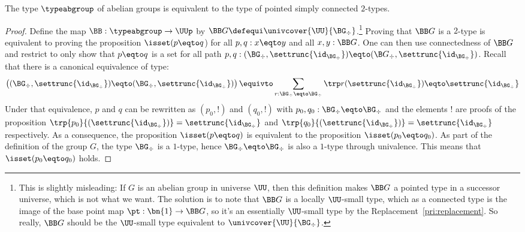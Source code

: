 \begin{theorem}\label{thm:abelian-groups-weq-sc2types}%
  The type $\typeabgroup$ of abelian groups is equivalent to the type
  of pointed simply connected $2$-types.
\end{theorem}
\begin{proof}
  Define the map $\BB : \typeabgroup \to \UUp$ by
  $\BB G\defequi \univcover{\UU}{\BG_\div}$.\footnote{%
    This is slightly misleading: If $G$ is an abelian group in
    universe $\UU$, then this definition makes $\BB G$ a pointed type
    in a successor universe, which is not what we want.  The solution
    is to note that $\BB G$ is a locally $\UU$-small type, which as a
    connected type is the image of the base point map
    $\pt : \bn{1} \to \BB G$, so it's an essentially $\UU$-small type
    by the Replacement~\cref{pri:replacement}.  So really, $\BB G$
    should be the $\UU$-small type equivalent to
    $\univcover{\UU}{\BG_\div}$.}  Proving that $\BB G$ is a $2$-type
  is equivalent to proving the proposition $\isset(p\eqto q$) for all
  $p,q:x\eqto y$ and all $x,y:\BB G$. One can then use connectedness
  of $\BB G$ and restrict to only show that $p\eqto q$ is a set for
  all path
  $p,q:(\BG_\div,\settrunc{\id_{\BG_\div}})\eqto ({\B
    G}_\div,\settrunc{\id_{\BG_\div}})$. Recall that there is a
  canonical equivalence of type:
  \begin{equation}\label{eq:}
    \left(
      (\BG_\div,\settrunc{\id_{\BG_\div}})\eqto (\BG_\div,\settrunc{\id_{\BG_\div}})
    \right)
    \equivto
    \sum_{r:\BG_\div \eqto \BG_\div}\trp r (\settrunc{\id_{\BG_\div}}) \eqto \settrunc{\id_{\BG_\div}}
  \end{equation}
  Under that equivalence, $p$ and $q$ can be rewritten as $(p_0,!)$
  and $(q_0,!)$ with $p_0,q_0 : \BG_\div\eqto \BG_\div$ and the
  elements $!$ are proofs of the proposition
  $\trp {p_0} {(\settrunc{\id_{\BG_\div}})} =
  \settrunc{\id_{\BG_\div}}$ and
  $\trp {q_0} {(\settrunc{\id_{\BG_\div}})} =
  \settrunc{\id_{\BG_\div}}$ respectively. As a consequence, the
  proposition $\isset(p\eqto q)$ is equivalent to the proposition
  $\isset(p_0\eqto q_0)$. As part of the definition of the group $G$,
  the type $\BG_\div$ is a $1$-type, hence $\BG_\div\eqto \BG_\div$ is
  also a $1$-type through univalence. This means that
  $\isset(p_0\eqto q_0)$ holds.


\end{proof}
